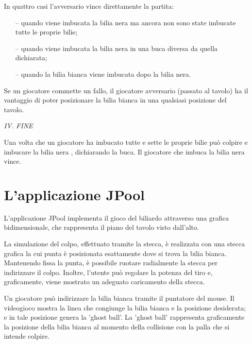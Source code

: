 \documentclass[12pt,a4paper]{report}
\begin{document}
\pagebreak
In quattro casi l'avversario vince direttamente la partita:
\begin{itemize}[noitemsep]
    \item[--] quando viene imbucata la bilia nera ma ancora non sono state imbucate tutte le proprie bilie;
    \item[--] quando viene imbucata la bilia nera in una buca diversa da quella dichiarata;
    \item[--] quando la bilia bianca viene imbucata dopo la bilia nera.
\end{itemize}

Se un giocatore commette un fallo, il giocatore avversario (passato al tavolo) ha il vantaggio di poter posizionare la bilia bianca in una qualsiasi posizione del tavolo.

\vspace{9mm}
\noindent \emph{IV. FINE}

Una volta che un giocatore ha imbucato tutte e sette le proprie bilie può colpire e imbucare la bilia nera , dichiarando la buca.
Il giocatore che imbuca la bilia nera vince.

\section{L'applicazione JPool} \label{se:JPool} %
L'applicazione JPool implementa il gioco del biliardo attraverso una grafica bidimensionale, che rappresenta il piano del tavolo visto dall'alto.

\vspace{3mm}

La simulazione del colpo, effettuato tramite la stecca, è realizzata con una stecca grafica la cui punta è posizionata esattamente dove si trova la bilia bianca.
Mantenendo fissa la punta, è possibile ruotare radialmente la stecca per indirizzare il colpo.
Inoltre, l'utente può regolare la potenza del tiro e, graficamente, viene mostrato un adeguato caricamento della stecca.

\vspace{3mm}

Un giocatore può indirizzare la bilia bianca tramite il puntatore del mouse.
Il videogioco mostra la linea che congiunge la bilia bianca e la posizione desiderata; e in tale posizione genera la 'ghost ball'.
La 'ghost ball' rappresenta graficamente la posizione della bilia bianca al momento della collisione con la palla che si intende colpire.

\vspace{3mm}
\end{document}
